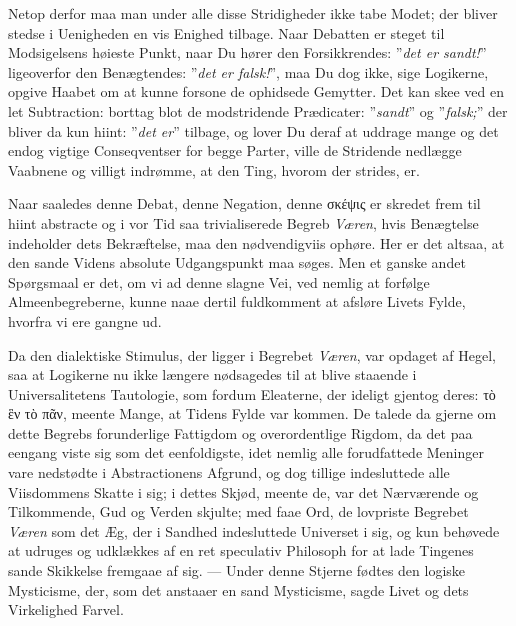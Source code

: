 \documentclass[12pt]{book}
\newcommand{\opage}[1]{\marginnote{\footnotesize\textit{[#1]}}}
\begin{document}
Netop derfor maa man under alle disse Stridigheder ikke tabe Modet; der bliver
stedse i Uenigheden en vis Enighed tilbage. Naar Debatten er steget til
Modsigelsens høieste Punkt, naar Du hører den Forsikkrendes: ”\emph{det er
sandt!}” ligeoverfor den Benægtendes: ”\emph{det er falsk!}”, maa Du dog ikke,
sige Logikerne, opgive Haabet om at kunne forsone de ophidsede Gemytter. Det
kan skee ved en let Subtraction: borttag blot de modstridende Prædicater:
”\emph{sandt}” og ”\emph{falsk;}” der bliver da kun hiint: ”\emph{det er}”
tilbage, og lover Du deraf at uddrage mange og det endog vigtige
Conseqventser for begge Parter, ville de Stridende nedlægge Vaabnene og
villigt indrømme, at den Ting, hvorom der strides, er.

Naar saaledes denne Debat, denne Negation, denne σκέψις er skredet frem til
hiint abstracte og i vor Tid saa trivialiserede Begreb \emph{Væren}, hvis
Benægtelse indeholder dets Bekræftelse, maa den nødvendigviis ophøre. Her er
det altsaa, at den sande Videns absolute Udgangspunkt maa søges. Men et ganske
andet Spørgsmaal er det, om vi ad denne slagne Vei, ved nemlig at forfølge
Almeenbegreberne, kunne naae dertil fuldkomment at afsløre Livets Fylde,
hvorfra vi ere gangne ud.

Da den dialektiske Stimulus, der ligger i Begrebet \emph{Væren}, var opdaget
af Hegel, saa at Logikerne nu ikke længere nødsagedes til at blive staaende i
Universalitetens Tautologie, som fordum Eleaterne, der ideligt gjentog deres:
τὸ ἓν τὸ πᾶν, meente Mange, at Tidens Fylde var kommen. De talede da gjerne om
dette Begrebs forunderlige Fattigdom og overordentlige Rigdom, da det paa
eengang viste sig som det eenfoldigste, idet nemlig alle forudfattede Meninger
vare nedstødte
\opage{8} i Abstractionens Afgrund, og dog tillige indesluttede alle Viisdommens Skatte
i sig; i dettes Skjød, meente de, var det Nærværende og Tilkommende, Gud og
Verden skjulte; med faae Ord, de lovpriste Begrebet \emph{Væren} som det Æg,
der i Sandhed indesluttede Universet i sig, og kun behøvede at udruges og
udklækkes af en ret speculativ Philosoph for at lade Tingenes sande Skikkelse
fremgaae af sig. --- Under denne Stjerne fødtes den logiske Mysticisme, der,
som det anstaaer en sand Mysticisme, sagde Livet og dets Virkelighed Farvel.
\end{document}
